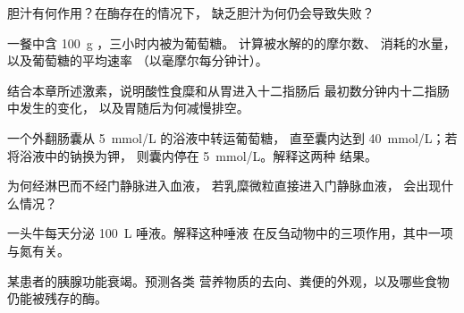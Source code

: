 \begin{exercise}[$\star$]\label{exo:b1:digestion-absorption:4}
胆汁有何作用？在酶存在的情况下，
缺乏胆汁为何仍会导致失败？
\end{exercise}

\begin{exercise}[$\star\star$]\label{exo:b1:digestion-absorption:5}
一餐中含 \qty{100}{g} ，三小时内被为葡萄糖。
计算被水解的的摩尔数、
消耗的水量，以及葡萄糖的平均速率
（以毫摩尔每分钟计）。
\end{exercise}

\begin{exercise}[$\star\star$]\label{exo:b1:digestion-absorption:6}
结合本章所述激素，说明酸性食糜和从胃进入十二指肠后
最初数分钟内十二指肠中发生的变化，
以及胃随后为何减慢排空。
\end{exercise}

\begin{exercise}[$\star\star$]\label{exo:b1:digestion-absorption:7}
一个外翻肠囊从 \qty{5}{mmol/L} 的浴液中转运葡萄糖，
直至囊内达到 \qty{40}{mmol/L}；若将浴液中的钠换为钾，
则囊内停在 \qty{5}{mmol/L}。解释这两种
结果。
\end{exercise}

\begin{exercise}[$\star\star$]\label{exo:b1:digestion-absorption:8}
为何经淋巴而不经门静脉进入血液，
若乳糜微粒直接进入门静脉血液，
会出现什么情况？
\end{exercise}

\begin{exercise}[$\star\star$]\label{exo:b1:digestion-absorption:9}
一头牛每天分泌 \qty{100}{L} 唾液。解释这种唾液
在反刍动物中的三项作用，其中一项与氮有关。
\end{exercise}

\begin{exercise}[$\star\star\star$]\label{exo:b1:digestion-absorption:10}
某患者的胰腺功能衰竭。预测各类
营养物质的去向、粪便的外观，以及哪些食物
仍能被残存的酶。
\end{exercise}

